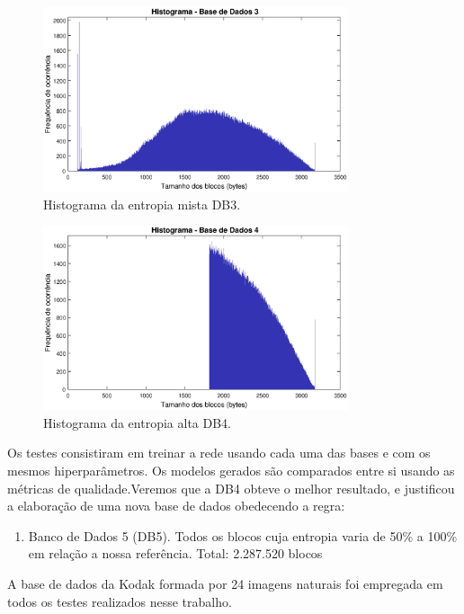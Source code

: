 \begin{figure}
\centering
\includegraphics[width=0.80\textwidth]{figuras/hist3.eps}
\caption[Histograma da entropia mista DB3.]{Histograma da entropia mista DB3.}
\label{fig:database3}
\end{figure}

\begin{figure}
\centering
\includegraphics[width=0.8\textwidth]{figuras/hist4.eps}
\caption[Histograma da entropia alta DB4.]{Histograma da entropia alta DB4.}
\label{fig:database4}
\end{figure}

Os testes consistiram em treinar a rede usando cada uma das bases e com os mesmos hiperparâmetros. Os modelos gerados são comparados entre si usando as métricas de qualidade.Veremos que a DB4 obteve o melhor resultado, e justificou a elaboração de uma nova base de dados obedecendo a regra:

\begin {enumerate}
\item Banco de Dados 5 (DB5). Todos os blocos cuja entropia varia de 50\% a 100\% em relação a nossa referência. Total: 2.287.520 blocos
\end{enumerate}

A base de dados da Kodak \cite{kodak} formada por 24 imagens naturais foi empregada em todos os testes realizados nesse trabalho.  

